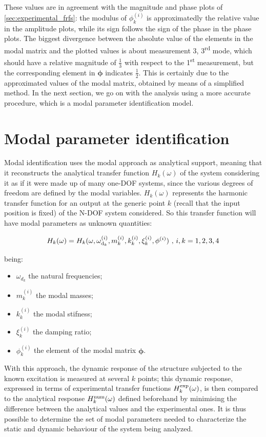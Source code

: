\documentclass[a4paper,12pt,oneside]{article}
\begin{document}
These values are in agreement with the magnitude and phase plots of \ref{sec:experimental_frfs}: the modulus of $ \phi^{(i)}_k $ is approximatedly the relative value in the amplitude plots, while its sign follows the sign of the phase in the phase plots. The biggest divergence between the absolute value of the elements in the modal matrix and the plotted values is about measurement 3, 3\textsuperscript{rd} mode, which should have a relative magnitude of $ \frac{1}{3} $ with respect to the 1\textsuperscript{st} measurement, but the corresponding element in $ \bm{\phi} $ indicates $ \frac{1}{2} $. This is certainly due to the approximated values of the modal matrix, obtained by means of a simplified method. In the next section, we go on with the analysis using a more accurate procedure, which is a modal parameter identification model.


\section{Modal parameter identification}

Modal identification uses the modal approach as analytical support, meaning that
it reconstructs the analytical transfer function $ H_k( \omega) $ of the system considering it as if it were made up of many one-DOF systems, since the various degrees of freedom are defined by the modal variables. $ H_k ( \omega) $ represents the harmonic transfer function for an output at the generic point $ k $ (recall that the input position is fixed) of the N-DOF system considered. So this transfer function will have modal parameters as unknown quantities:

\[
	H_k(\omega) = H_k(\omega, \omega_{\textup{d}_k}^{(i)},
		m_k ^{(i)}, k_k ^{(i)}, \xi_k ^{(i)}, \mathbf{\phi}^{(i)})
		~ \text{,} ~ i,k = 1,2,3,4
\]

being:

\begin{itemize}
	\item $ \omega_{d_k} $ the natural frequencies;
	\item $ m_k ^{(i)} $ the modal masses;
	\item $ k_k ^{(i)} $ the modal stifness;
	\item $ \xi_k ^{(i)} $ the damping ratio;
	\item $ \phi_k^{(i)} $ the element of the modal matrix $ \bm{\phi} $.
\end{itemize}

With this approach, the dynamic response of the structure subjected to the known excitation is measured at several $ k $ points; this dynamic response, expressed in terms of experimental transfer functions $ H^\textup{exp}_k(\omega) $, is then compared to the analytical response $ H^\textup{num}_k(\omega) $ defined beforehand by minimising the difference between the analytical values and the experimental ones. It is thus possible to determine the set of modal parameters needed to characterize the static and dynamic behaviour of the system being analyzed.
\end{document}
